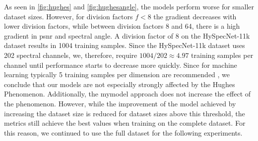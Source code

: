 As seen in \autoref{fig:hughes} and \autoref{fig:hughesangle}, the models perform worse for smaller dataset sizes. However, for division factors $f < 8$ the gradient decreases with lower division factors, while between division factors 8 and 64, there is a high gradient in \ac{psnr} and spectral angle. A division factor of 8 on the HySpecNet-11k dataset results in 1004 training samples. Since the HySpecNet-11k dataset uses 202 spectral channels, we, therefore, require $1004/202 \approx 4.97$ training samples per channel until performance starts to decrease more quickly. Since for machine learning typically 5 training samples per dimension are recommended \citep{theodoridis_pattern_2009}, we conclude that our models are not especially strongly affected by the Hughes Phenomenon. Additionally, the \ac{mymodel} approach does not increase the effect of the phenomenon. However, while the improvement of the model achieved by increasing the dataset size is reduced for dataset sizes above this threshold, the metrics still achieve the best values when training on the complete dataset. For this reason, we continued to use the full dataset for the following experiments.
